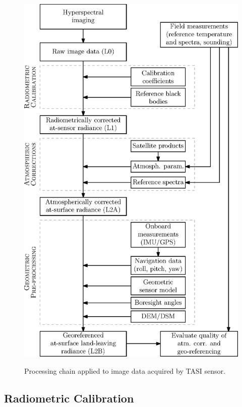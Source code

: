\begin{figure}[thb]
	\centering
	\vspace{0.7 em}
	\includegraphics[scale=1]{pics/Chapter_02/Fig_2_3.eps}
	\label{fig:ProcessingChain}
	\vspace{2 em}
	\caption{Processing chain applied to image data acquired by TASI sensor.}
	\label{fig:ProcessingChain}
	\vspace{0.7 em}
\end{figure}


\subsection*{Radiometric Calibration}

